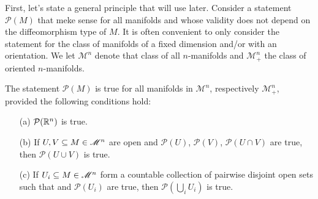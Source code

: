 First, let's state a general principle that will use later. Consider a statement $\mathcal{P}(M)$ that meke sense for all manifolds and whose validity does not depend 
on the diffeomorphism type of $M$. It is often convenient to only consider the statement for the class of manifolds of a fixed dimension and/or with an orientation. We 
let $\mathscr{M}^n$ denote that class of all $n$-manifolds and $\mathscr{M}^n_+$ the class of oriented 
$n$-manifolds.
\begin{theorem}
The statement $\mathcal{P}(M)$ is true for all manifolds in $\mathscr{M}^n$, respectively $\mathscr{M}^n_+$, provided the following conditions hold:
\begin{itemize}
\item[(a)] $\mathcal{P}(\mathbb{R}^n)$ is true.
\item[(b)] If $U,V\subseteq M\in\mathscr{M}^n$ are open and $\mathcal{P}(U)$, $\mathcal{P}(V)$, $\mathcal{P}(U\cap V)$ are true, then $\mathcal{P}(U\cup V)$ is true.
\item[(c)] If $U_i\subseteq M\in\mathscr{M}^n$ form a countable collection of pairwise disjoint open sets such that and $\mathcal{P}(U_i)$ are true, then $\mathcal{P}(\bigcup_iU_i)$ 
is true.
\end{itemize}
\end{theorem}
